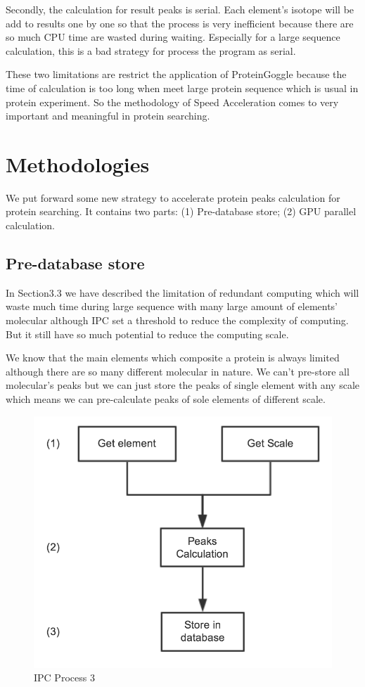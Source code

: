 \documentclass[letterpaper,twocolumn,10pt]{article}
\begin{document}
Secondly, the calculation for result peaks is serial. Each element's isotope will be add to results one by one so that the process is very  inefficient because there are so much CPU time are wasted during waiting. Especially for a large sequence calculation, this is a bad strategy for process the program as serial.

These two limitations are restrict the application of ProteinGoggle because the time of calculation is too long when meet large protein sequence which is usual in protein experiment. So the methodology of Speed Acceleration comes to very important and meaningful in 
protein searching. 

\section{Methodologies}

We put forward some new strategy to accelerate protein peaks calculation for protein searching.  It contains two parts: (1) Pre-database store; (2) GPU parallel calculation.

\subsection{Pre-database store}

In Section3.3 we have described the limitation of redundant computing which will waste much time during large sequence with many large amount of elements' molecular although IPC set a threshold to reduce the complexity of computing. But it still have so much potential to reduce the computing scale. 

We know that the main elements which composite a protein is always limited although there are so many different molecular in nature.  We can't pre-store all molecular's peaks but we can just store the peaks of single element with any scale which means we can pre-calculate peaks of sole elements of different scale. 

\begin{figure}[h!]
\centering
\includegraphics[scale=0.45]{ipc03}
\caption{IPC Process 3}
\label{threadsVsSync}
\end{figure}
\end{document}
